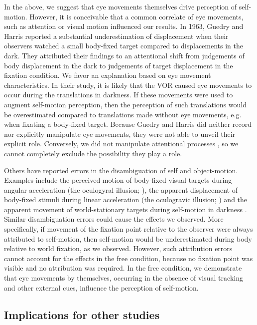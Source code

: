In the above, we suggest that eye movements themselves drive perception of self-motion. However, it is conceivable that a common correlate of eye movements, such as attention or visual motion influenced our results. In 1963, Guedry and Harris reported a substantial underestimation of displacement when their observers watched a small body-fixed target compared to displacements in the dark. They attributed their findings to an attentional shift from judgements of body displacement in the dark to judgements of target displacement in the fixation condition. We favor an explanation based on eye movement characteristics.  In their study, it is likely that the VOR caused eye movements  to occur during the translations in darkness. If these movements were used to augment self-motion perception, then the perception of such translations would be overestimated compared to translations made without eye movements, e.g. when fixating a body-fixed target. Because Guedry and Harris \citeyear{guedry1963} did neither record nor explicitly manipulate eye movements, they were not able to unveil their explicit role. Conversely, we did not manipulate attentional processes \cite{kitazaki2003}, so we cannot completely exclude the possibility they play a role.

Others have reported errors in the disambiguation of self and object-motion. Examples include the perceived motion of body-fixed visual targets during angular acceleration (the oculogyral illusion; ), the apparent displacement of body-fixed stimuli during linear acceleration (the oculogravic illusion; ) and the apparent movement of world-stationary targets during self-motion in darkness \cite{dyde2008}. Similar disambiguation errors could cause the effects we observed. More specifically, if movement of the fixation point relative to the observer were always attributed to self-motion, then self-motion would be underestimated during body relative to world fixation, as we observed. However, such attribution errors cannot account for the effects in the free condition, because no fixation point was visible and no attribution was required. In the free condition, we demonstrate that eye movements by themselves, occurring in the absence of visual tracking and other external cues, influence the perception of self-motion.

\subsection{Implications for other studies}


